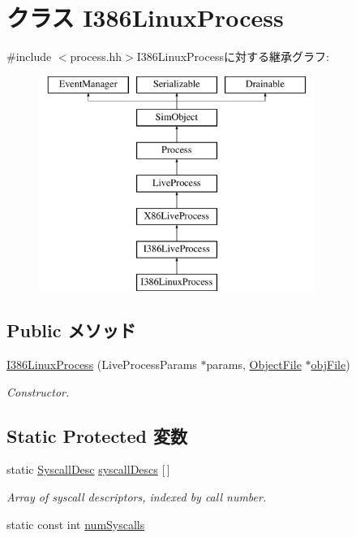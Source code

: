 \hypertarget{classX86ISA_1_1I386LinuxProcess}{
\section{クラス I386LinuxProcess}
\label{classX86ISA_1_1I386LinuxProcess}
}


{\ttfamily \#include $<$process.hh$>$}I386LinuxProcessに対する継承グラフ:\begin{figure}[H]
\begin{center}
\leavevmode
\includegraphics[height=7cm]{classX86ISA_1_1I386LinuxProcess}
\end{center}
\end{figure}
\subsection*{Public メソッド}
\begin{DoxyCompactItemize}
\item 
\hyperlink{classX86ISA_1_1I386LinuxProcess_a338fe96c7b56e27c466b7c4dc5d7b012}{I386LinuxProcess} (LiveProcessParams $\ast$params, \hyperlink{classObjectFile}{ObjectFile} $\ast$\hyperlink{classLiveProcess_ab6cfcfa7903c66267b3e0351c3caa809}{objFile})
\begin{DoxyCompactList}\small\item\em Constructor. \item\end{DoxyCompactList}\end{DoxyCompactItemize}
\subsection*{Static Protected 変数}
\begin{DoxyCompactItemize}
\item 
static \hyperlink{classSyscallDesc}{SyscallDesc} \hyperlink{classX86ISA_1_1I386LinuxProcess_a08d67a94820b75842e07f030e548372e}{syscallDescs} \mbox{[}$\,$\mbox{]}
\begin{DoxyCompactList}\small\item\em Array of syscall descriptors, indexed by call number. \item\end{DoxyCompactList}\item 
static const int \hyperlink{classX86ISA_1_1I386LinuxProcess_af2d1f57bee0c3a25f48faee7ab23c768}{numSyscalls}
\end{DoxyCompactItemize}


